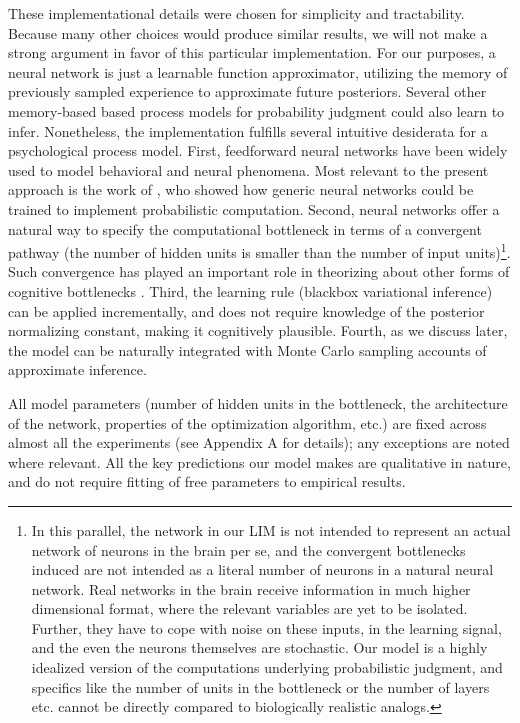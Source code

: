 These implementational details were chosen for simplicity and tractability. Because many other choices would produce similar results, we will not make a strong argument in favor of this particular implementation. For our purposes, a neural network is just a learnable function approximator, utilizing the memory of previously sampled experience to approximate future posteriors. Several other memory-based based process models for probability judgment \citep[for example:][]{dougherty1999minerva, shi2010exemplar, dasgupta2018remembrance, stewart2006decision, hertwig2009description} could also learn to infer. Nonetheless, the implementation fulfills several intuitive desiderata for a psychological process model. First, feedforward neural networks have been widely used to model behavioral and neural phenomena. Most relevant to the present approach is the work of \citet{orhan2017efficient}, who showed how generic neural networks could be trained to implement probabilistic computation. Second, neural networks offer a natural way to specify the computational bottleneck in terms of a convergent pathway (the number of hidden units is smaller than the number of input units)\footnote{In this parallel, the network in our LIM is not intended to represent an actual network of neurons in the brain per se, and the convergent bottlenecks induced are not intended as a literal number of neurons in a natural neural network. Real networks in the brain receive information in much higher dimensional format, where the relevant variables are yet to be isolated. Further, they have to cope with noise on these inputs, in the learning signal, and the even the neurons themselves are stochastic. Our model is a highly idealized version of the computations underlying probabilistic judgment, and specifics like the number of units in the bottleneck or the number of layers etc. cannot be directly compared to biologically realistic analogs.}. Such convergence has played an important role in theorizing about other forms of cognitive bottlenecks \citep[e.g.,][]{feng2014multitasking,alon2017graph}. Third, the learning rule (blackbox variational inference) can be applied incrementally, and does not require knowledge of the posterior normalizing constant, making it cognitively plausible. Fourth, as we discuss later, the model can be naturally integrated with Monte Carlo sampling accounts of approximate inference.

All model parameters (number of hidden units in the bottleneck, the architecture of the network, properties of the optimization algorithm, etc.) are fixed across almost all the experiments (see Appendix A for details); any exceptions are noted where relevant. All the key predictions our model makes are qualitative in nature, and do not require fitting of free parameters to empirical results.

